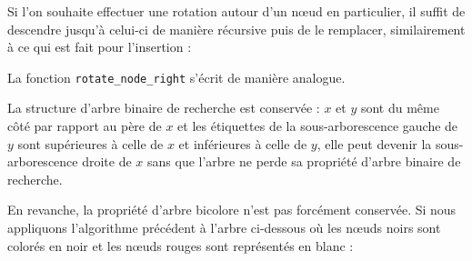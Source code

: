 Si l'on souhaite effectuer une rotation autour d'un nœud en particulier, il suffit de descendre jusqu'à celui-ci de manière récursive puis de le remplacer, similairement à ce qui est fait pour l'insertion :



La fonction \texttt{rotate\_node\_right} s'écrit de manière analogue.
\medskip

La structure d'arbre binaire de recherche est conservée : $x$ et $y$ sont du même côté par rapport au père de $x$ et les étiquettes de la sous-arborescence gauche de $y$ sont supérieures à celle de $x$ et inférieures à celle de $y$, elle peut devenir la sous-arborescence droite de $x$ sans que l'arbre ne perde sa propriété d'arbre binaire de recherche.
\newpage

En revanche, la propriété d'arbre bicolore n'est pas forcément conservée. Si nous appliquons l'algorithme précédent à l'arbre ci-dessous où les nœuds noirs sont colorés en noir et les nœuds rouges sont représentés en blanc :
\medskip

